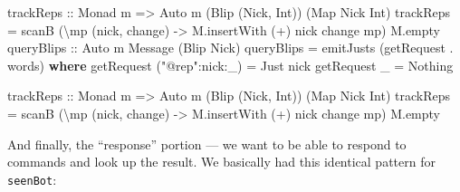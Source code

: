 \documentclass[]{article}
\newenvironment{Shaded}{}{}
\newcommand{\KeywordTok}[1]{\textcolor[rgb]{0.00,0.44,0.13}{\textbf{{#1}}}}
\newcommand{\DataTypeTok}[1]{\textcolor[rgb]{0.56,0.13,0.00}{{#1}}}
\newcommand{\StringTok}[1]{\textcolor[rgb]{0.25,0.44,0.63}{{#1}}}
\newcommand{\OtherTok}[1]{\textcolor[rgb]{0.00,0.44,0.13}{{#1}}}
\newcommand{\FunctionTok}[1]{\textcolor[rgb]{0.02,0.16,0.49}{{#1}}}
\newcommand{\NormalTok}[1]{{#1}}
\begin{document}
\begin{Shaded}
\begin{Highlighting}[]
\OtherTok{    trackReps ::} \DataTypeTok{Monad} \NormalTok{m }\OtherTok{=>} \DataTypeTok{Auto} \NormalTok{m (}\DataTypeTok{Blip} \NormalTok{(}\DataTypeTok{Nick}\NormalTok{, }\DataTypeTok{Int}\NormalTok{)) (}\DataTypeTok{Map} \DataTypeTok{Nick} \DataTypeTok{Int}\NormalTok{)}
    \NormalTok{trackReps }\FunctionTok{=} \NormalTok{scanB (\textbackslash{}mp (nick, change) }\OtherTok{->} \NormalTok{M.insertWith (}\FunctionTok{+}\NormalTok{) nick change mp) M.empty}
\OtherTok{    queryBlips ::} \DataTypeTok{Auto} \NormalTok{m }\DataTypeTok{Message} \NormalTok{(}\DataTypeTok{Blip} \DataTypeTok{Nick}\NormalTok{)}
    \NormalTok{queryBlips }\FunctionTok{=} \NormalTok{emitJusts (getRequest }\FunctionTok{.} \NormalTok{words)}
      \KeywordTok{where}
        \NormalTok{getRequest (}\StringTok{"@rep"}\FunctionTok{:}\NormalTok{nick}\FunctionTok{:}\NormalTok{_) }\FunctionTok{=} \DataTypeTok{Just} \NormalTok{nick}
        \NormalTok{getRequest _                }\FunctionTok{=} \DataTypeTok{Nothing}



\OtherTok{trackReps ::} \DataTypeTok{Monad} \NormalTok{m }\OtherTok{=>} \DataTypeTok{Auto} \NormalTok{m (}\DataTypeTok{Blip} \NormalTok{(}\DataTypeTok{Nick}\NormalTok{, }\DataTypeTok{Int}\NormalTok{)) (}\DataTypeTok{Map} \DataTypeTok{Nick} \DataTypeTok{Int}\NormalTok{)}
\NormalTok{trackReps }\FunctionTok{=} \NormalTok{scanB (\textbackslash{}mp (nick, change) }\OtherTok{->} \NormalTok{M.insertWith (}\FunctionTok{+}\NormalTok{) nick change mp) M.empty}
\end{Highlighting}
\end{Shaded}

And finally, the ``response'' portion --- we want to be able to respond
to commands and look up the result. We basically had this identical
pattern for \texttt{seenBot}:
\end{document}
